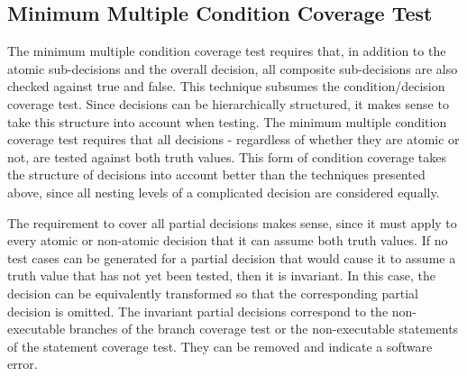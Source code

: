 	\subsection{Minimum Multiple Condition Coverage Test}
	The minimum multiple condition coverage test requires that, in addition to the atomic sub-decisions and the overall decision, all composite sub-decisions are also checked against true and false. This technique subsumes the condition/decision coverage test. Since decisions can be hierarchically structured, it makes sense to take this structure into account when testing. The minimum multiple condition coverage test requires that all decisions - regardless of whether they are atomic or not, are tested against both truth values. This form of condition coverage takes the structure of decisions into account better than the techniques presented above, since all nesting levels of a complicated decision are considered equally.


	The requirement to cover all partial decisions makes sense, since it must apply to every atomic or non-atomic decision that it can assume both truth values. If no test cases can be generated for a partial decision that would cause it to assume a truth value that has not yet been tested, then it is invariant. In this case, the decision can be equivalently transformed so that the corresponding partial decision is omitted. The invariant partial decisions correspond to the non-executable branches of the branch coverage test or the non-executable statements of the statement coverage test. They can be removed and indicate a software error.

